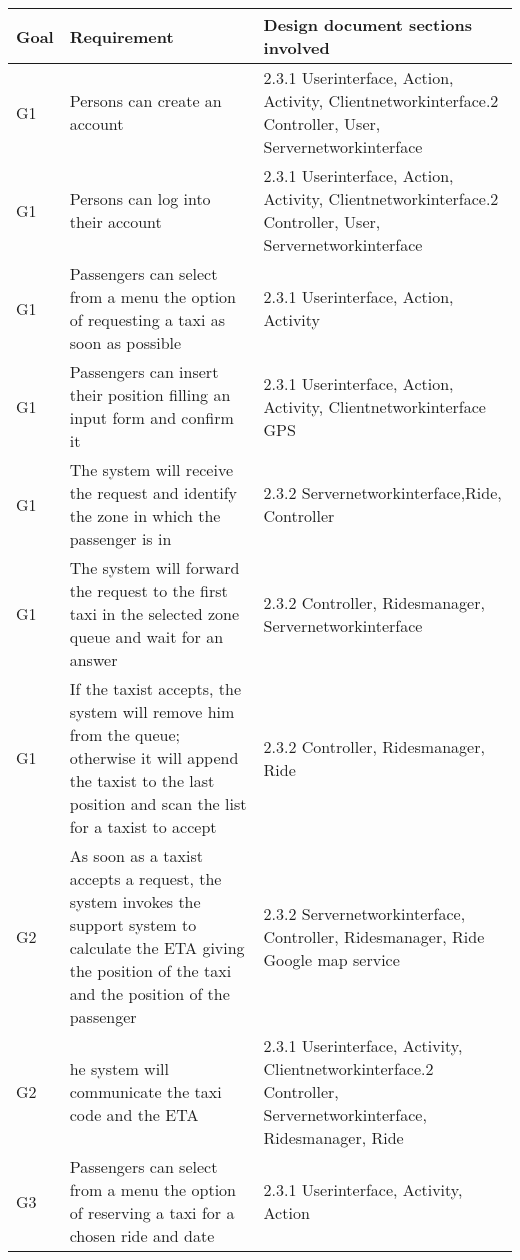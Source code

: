 \begin{center}
 \begin{longtable}{| m{2cm} | m{6cm} | m{5cm} | }
 \hline
  Goal & Requirement & Design document sections \newline involved\\
 \hline\hline
 \endhead
   G1&	Persons can create an account& 2.3.1 Userinterface, Action, Activity, Clientnetworkinterface\newline
					2.3.2 Controller, User, Servernetworkinterface\\ \hline
   G1&	Persons can log into their account& 2.3.1 Userinterface, Action, Activity, Clientnetworkinterface\newline
					      2.3.2 Controller, User, Servernetworkinterface\\ \hline
   G1&	Passengers can select from a menu the option of requesting a taxi as soon as possible& 2.3.1 Userinterface, Action, Activity\\ \hline
   G1&	Passengers can insert their position filling an input form and confirm it& 2.3.1 Userinterface, Action, Activity, Clientnetworkinterface\newline 
										    2.1 GPS \\ \hline
   G1&	The system will receive the request and identify the zone in which the passenger is in	& 2.3.2 Servernetworkinterface,Ride, Controller \\ \hline 
   G1&	The system will forward the request to the first taxi in the selected zone queue and wait for an answer	& 2.3.2 Controller, Ridesmanager, Servernetworkinterface\\ \hline
   G1&	If the taxist accepts, the system will remove him from the queue; otherwise it will append the taxist to the last position and
scan the list for a taxist to accept& 2.3.2 Controller, Ridesmanager, Ride\\ \hline
    G2&	As soon as a taxist accepts a request, the system invokes the support system to calculate the ETA giving the position of the 
	taxi and the position of the passenger& 2.3.2 Servernetworkinterface, Controller, Ridesmanager, Ride \newline
						2.5 Google map service\\ \hline
    G2& he system will communicate the taxi code and the ETA& 2.3.1 Userinterface, Activity, Clientnetworkinterface\newline
								2.3.2 Controller, Servernetworkinterface, Ridesmanager, Ride\\ \hline
    G3& Passengers can select from a menu the option of reserving a taxi for a chosen ride and date & 2.3.1 Userinterface, Activity, Action \\ \hline

\end{longtable}
\end{center}
